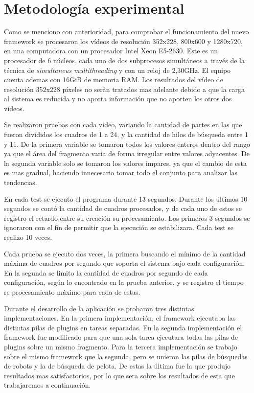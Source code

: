 
\section{Metodología experimental}

Como se menciono con anterioridad, para comprobar el funcionamiento del nuevo
framework se procesaron los vídeos de resolución 352x228, 800x600 y 1280x720, en
una computadora con un procesador Intel Xeon E5-2630. Este es un procesador de 6
núcleos, cada uno de dos subprocesos simultáneos a través de la técnica de
\emph{simultaneus multithreading} y con un reloj de 2,30GHz. El equipo cuenta
ademas con 16GiB de memoria RAM. Los resultados del vídeo de resolución 352x228
píxeles no serán tratados mas adelante debido a que la carga al sistema es
reducida y no aporta información que no aporten los otros dos vídeos.

Se realizaron pruebas con cada vídeo, variando la cantidad de partes en las que
fueron divididos los cuadros de 1 a 24, y la cantidad de hilos de búsqueda entre
1 y 11. De la primera variable se tomaron todos los valores enteros dentro del
rango ya que el área del fragmento varia de forma irregular entre valores
adyacentes. De la segunda variable solo se tomaron los valores impares, ya que
el cambio de esta es mas gradual, haciendo innecesario tomar todo el conjunto
para analizar las tendencias.

En cada test se ejecuto el programa durante 13 segundos. Durante los últimos 10
segundos se contó la cantidad de cuadros procesados, y de cada uno de estos se
registro el retardo entre su creación su procesamiento. Los primeros 3 segundos
se ignoraron con el fin de permitir que la ejecución se estabilizara. Cada test
se realizo 10 veces.

Cada prueba se ejecuto dos veces, la primera buscando el mínimo de la cantidad
máxima de cuadros por segundo que soporta el sistema bajo cada configuración. En
la segunda se limito la cantidad de cuadros por segundo de cada configuración,
según lo encontrado en la prueba anterior, y se registro el tiempo re
procesamiento máximo para cada de estas.

Durante el desarrollo de la aplicación se probaron tres distintas
implementaciones. En la primera implementación, el framework ejecutaba las
distintas pilas de plugins en tareas separadas. En la segunda implementación el
framework fue modificado para que una sola tarea ejecutara todas las pilas de
plugins sobre un mismo fragmento. Para la tercera implementación se trabajo
sobre el mismo framework que la segunda, pero se unieron las pilas de búsquedas
de robots y la de búsqueda de pelota. De estas la última fue la que produjo
resultados mas satisfactorios, por lo que sera sobre los resultados de esta que
trabajaremos a continuación.


